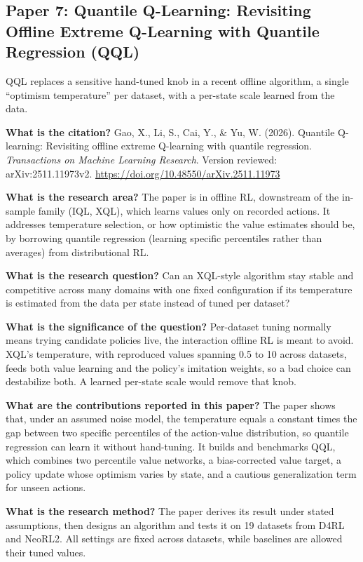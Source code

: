 \documentclass[11pt]{article}
\newcommand{\paper}[1]{\subsection*{#1}}
\newcommand{\q}[2]{\item \textbf{#1} #2}
\begin{document}
\paper{Paper 7: Quantile Q-Learning: Revisiting Offline Extreme Q-Learning with Quantile Regression (QQL)}
QQL replaces a sensitive hand-tuned knob in a recent offline algorithm, a single ``optimism temperature'' per dataset, with a per-state scale learned from the data.
\begin{qna}

\q{What is the citation?}
Gao, X., Li, S., Cai, Y., \& Yu, W. (2026). Quantile Q-learning: Revisiting offline extreme Q-learning with quantile regression. \emph{Transactions on Machine Learning Research}. Version reviewed: arXiv:2511.11973v2. \url{https://doi.org/10.48550/arXiv.2511.11973}

\q{What is the research area?}
The paper is in offline RL, downstream of the in-sample family (IQL, XQL), which learns values only on recorded actions. It addresses temperature selection, or how optimistic the value estimates should be, by borrowing quantile regression (learning specific percentiles rather than averages) from distributional RL.

\q{What is the research question?}
Can an XQL-style algorithm stay stable and competitive across many domains with one fixed configuration if its temperature is estimated from the data per state instead of tuned per dataset?

\q{What is the significance of the question?}
Per-dataset tuning normally means trying candidate policies live, the interaction offline RL is meant to avoid. XQL's temperature, with reproduced values spanning 0.5 to 10 across datasets, feeds both value learning and the policy's imitation weights, so a bad choice can destabilize both. A learned per-state scale would remove that knob.

\q{What are the contributions reported in this paper?}
The paper shows that, under an assumed noise model, the temperature equals a constant times the gap between two specific percentiles of the action-value distribution, so quantile regression can learn it without hand-tuning. It builds and benchmarks QQL, which combines two percentile value networks, a bias-corrected value target, a policy update whose optimism varies by state, and a cautious generalization term for unseen actions.

\q{What is the research method?}
The paper derives its result under stated assumptions, then designs an algorithm and tests it on 19 datasets from D4RL and NeoRL2. All settings are fixed across datasets, while baselines are allowed their tuned values.


\end{qna}
\end{document}
